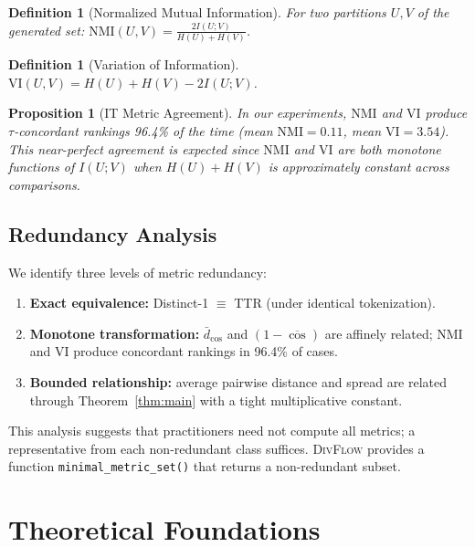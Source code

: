 \documentclass[11pt,a4paper]{article}
\newtheorem{proposition}[theorem]{Proposition}
\newtheorem{definition}[theorem]{Definition}
\newcommand{\divflow}{\textsc{DivFlow}}
\newcommand{\NMI}{\mathrm{NMI}}
\newcommand{\VI}{\mathrm{VI}}
\begin{document}
\begin{definition}[Normalized Mutual Information]
For two partitions $U, V$ of the generated set:
$\NMI(U, V) = \frac{2 I(U; V)}{H(U) + H(V)}$.
\end{definition}

\begin{definition}[Variation of Information]
$\VI(U, V) = H(U) + H(V) - 2I(U; V)$.
\end{definition}

\begin{proposition}[IT Metric Agreement]\label{prop:it_agree}
In our experiments, $\NMI$ and $\VI$ produce
$\tau$-concordant rankings 96.4\% of the time
(mean $\NMI = 0.11$, mean $\VI = 3.54$).
This near-perfect agreement is expected since
$\NMI$ and $\VI$ are both monotone functions of
$I(U;V)$ when $H(U) + H(V)$ is approximately constant
across comparisons.
\end{proposition}

\subsection{Redundancy Analysis}

We identify three levels of metric redundancy:

\begin{enumerate}[leftmargin=2em]
\item \textbf{Exact equivalence:} Distinct-1 $\equiv$ TTR
      (under identical tokenization).
\item \textbf{Monotone transformation:}
      $\bar{d}_{\cos}$ and $(1 - \overline{\cos})$ are affinely
      related; NMI and VI produce concordant rankings in 96.4\%
      of cases.
\item \textbf{Bounded relationship:} average pairwise distance
      and spread are related through Theorem~\ref{thm:main}
      with a tight multiplicative constant.
\end{enumerate}

This analysis suggests that practitioners need not compute all
metrics; a representative from each non-redundant class suffices.
\divflow{} provides a function \texttt{minimal\_metric\_set()}
that returns a non-redundant subset.

\section{Theoretical Foundations}\label{sec:theory}
\end{document}
